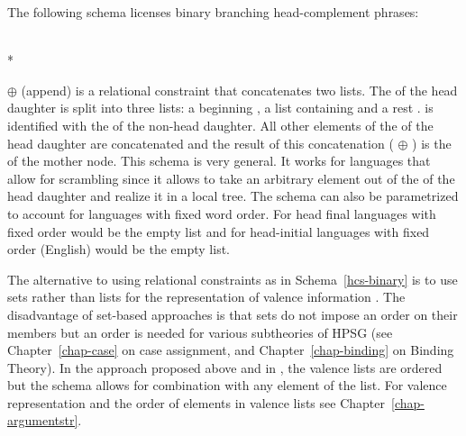 \documentclass[output=paper]{langsci/langscibook}
\begin{document}
The following schema licenses binary branching head-complement phrases:
\begin{schema}
\label{hcs-binary}
 \impl\\*
\end{schema}
$\oplus$ (append) is a relational constraint that concatenates two lists. The \compsl of the head
daughter is split into three lists: a beginning , a list containing  and a rest
.  is identified with the \synsemv of the non-head daughter. All other elements of
the \compsl of the head daughter are concatenated and the result of this concatenation (
$\oplus$ ) is the \compsl of the mother node. This schema is very general. It works for
languages that allow for scrambling since it allows to take an arbitrary element out of the \compsl
of the head daughter and realize it in a local tree. The schema can also be parametrized to account
for languages with fixed word order. For head final languages with fixed order  would be the
empty list and for head-initial languages with fixed order (\eg English)  would be the empty list.

The alternative to using relational constraints as in Schema~\ref{hcs-binary} is to use sets rather
than lists for the representation of valence information
\citep*{Gunji86a,HN89a,Pollard90a,EEU92a}. The disadvantage of set-based approaches is that sets do
not impose an order on their members but an order is needed for various subtheories of HPSG (see
Chapter~\ref{chap-case} on case assignment, and Chapter~\ref{chap-binding} on Binding Theory). In
the approach proposed above and in , the valence lists are
ordered but the schema allows for combination with any element of the list. For valence
representation and the order of elements in valence lists see
Chapter~\ref{chap-argumentstr}.
\end{document}
